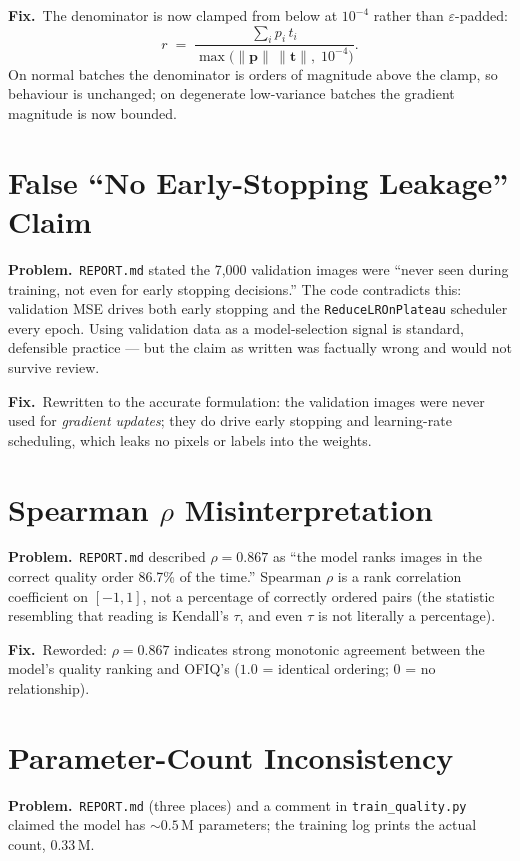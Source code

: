 \documentclass[12pt, letterpaper]{article}
\newcommand{\code}[1]{\texttt{#1}}
\newcommand{\problem}[1]{\textbf{Problem.}~#1}
\newcommand{\fix}[1]{\textbf{Fix.}~#1}
\begin{document}
\fix{The denominator is now clamped from below at $10^{-4}$ rather than
$\varepsilon$-padded:
\[
r \;=\; \frac{\sum_i p_i\, t_i}{\max\!\bigl(\|\mathbf{p}\|\,\|\mathbf{t}\|,\; 10^{-4}\bigr)} .
\]
On normal batches the denominator is orders of magnitude above the clamp, so behaviour
is unchanged; on degenerate low-variance batches the gradient magnitude is now bounded.}

\section{False ``No Early-Stopping Leakage'' Claim}

\problem{\code{REPORT.md} stated the 7{,}000 validation images were ``never seen during
training, not even for early stopping decisions.'' The code contradicts this: validation
MSE drives both early stopping and the \code{ReduceLROnPlateau} scheduler every epoch.
Using validation data as a model-selection signal is standard, defensible practice ---
but the claim as written was factually wrong and would not survive review.}

\fix{Rewritten to the accurate formulation: the validation images were never used for
\emph{gradient updates}; they do drive early stopping and learning-rate scheduling,
which leaks no pixels or labels into the weights.}

\section{Spearman $\rho$ Misinterpretation}

\problem{\code{REPORT.md} described $\rho = 0.867$ as ``the model ranks images in the
correct quality order 86.7\% of the time.'' Spearman $\rho$ is a rank correlation
coefficient on $[-1, 1]$, not a percentage of correctly ordered pairs (the statistic
resembling that reading is Kendall's $\tau$, and even $\tau$ is not literally a
percentage).}

\fix{Reworded: $\rho = 0.867$ indicates strong monotonic agreement between the model's
quality ranking and OFIQ's ($1.0$ = identical ordering; $0$ = no relationship).}

\section{Parameter-Count Inconsistency}

\problem{\code{REPORT.md} (three places) and a comment in \code{train\_quality.py}
claimed the model has ${\sim}0.5$\,M parameters; the training log prints the actual
count, $0.33$\,M.}
\end{document}

